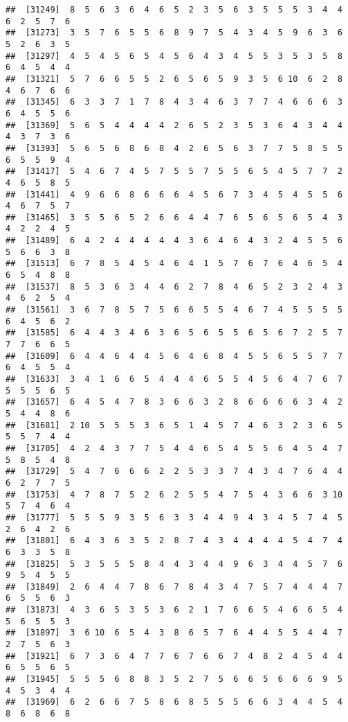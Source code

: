 \documentclass[
]{book}
\begin{document}
\begin{verbatim}
##  [31249]  8  5  6  3  6  4  6  5  2  3  5  6  3  5  5  5  3  4  4  6  2  5  7  6
##  [31273]  3  5  7  6  5  5  6  8  9  7  5  4  3  4  5  9  6  3  6  5  2  6  3  5
##  [31297]  4  5  4  5  6  5  4  5  6  4  3  4  5  5  3  5  3  5  8  6  4  5  4  4
##  [31321]  5  7  6  6  5  5  2  6  5  6  5  9  3  5  6 10  6  2  8  4  6  7  6  6
##  [31345]  6  3  3  7  1  7  8  4  3  4  6  3  7  7  4  6  6  6  3  6  4  5  5  6
##  [31369]  5  6  5  4  4  4  4  2  6  5  2  3  5  3  6  4  3  4  4  4  3  7  3  6
##  [31393]  5  6  5  6  8  6  8  4  2  6  5  6  3  7  7  5  8  5  5  6  5  5  9  4
##  [31417]  5  4  6  7  4  5  7  5  5  7  5  5  6  5  4  5  7  7  2  4  6  5  8  5
##  [31441]  4  9  6  6  8  6  6  6  4  5  6  7  3  4  5  4  5  5  6  4  6  7  5  7
##  [31465]  3  5  5  6  5  2  6  6  4  4  7  6  5  6  5  6  5  4  3  4  2  2  4  5
##  [31489]  6  4  2  4  4  4  4  4  3  6  4  6  4  3  2  4  5  5  6  5  6  6  3  8
##  [31513]  6  7  8  5  4  5  4  6  4  1  5  7  6  7  6  4  6  5  4  6  5  4  8  8
##  [31537]  8  5  3  6  3  4  4  6  2  7  8  4  6  5  2  3  2  4  3  4  6  2  5  4
##  [31561]  3  6  7  8  5  7  5  6  6  5  5  4  6  7  4  5  5  5  5  6  4  5  6  2
##  [31585]  6  4  4  3  4  6  3  6  5  6  5  5  6  5  6  7  2  5  7  7  7  6  6  5
##  [31609]  6  4  4  6  4  4  5  6  4  6  8  4  5  5  6  5  5  7  7  6  4  5  5  4
##  [31633]  3  4  1  6  6  5  4  4  4  6  5  5  4  5  6  4  7  6  7  5  5  5  6  5
##  [31657]  6  4  5  4  7  8  3  6  6  3  2  8  6  6  6  6  3  4  2  5  4  4  8  6
##  [31681]  2 10  5  5  5  3  6  5  1  4  5  7  4  6  3  2  3  6  5  5  5  7  4  4
##  [31705]  4  2  4  3  7  7  5  4  4  6  5  4  5  5  6  4  5  4  7  5  8  5  4  8
##  [31729]  5  4  7  6  6  6  2  2  5  3  3  7  4  3  4  7  6  4  4  6  2  7  7  5
##  [31753]  4  7  8  7  5  2  6  2  5  5  4  7  5  4  3  6  6  3 10  5  7  4  6  4
##  [31777]  5  5  5  9  3  5  6  3  3  4  4  9  4  3  4  5  7  4  5  2  6  4  2  6
##  [31801]  6  4  3  6  3  5  2  8  7  4  3  4  4  4  4  5  4  7  4  6  3  3  5  8
##  [31825]  5  3  5  5  5  8  4  4  3  4  4  9  6  3  4  4  5  7  6  9  5  4  5  5
##  [31849]  2  6  4  4  7  8  6  7  8  4  3  4  7  5  7  4  4  4  7  6  5  5  6  3
##  [31873]  4  3  6  5  3  5  3  6  2  1  7  6  6  5  4  6  6  5  4  5  6  5  5  3
##  [31897]  3  6 10  6  5  4  3  8  6  5  7  6  4  4  5  5  4  4  7  2  7  5  6  3
##  [31921]  6  7  3  6  4  7  7  6  7  6  6  7  4  8  2  4  5  4  4  6  5  5  6  5
##  [31945]  5  5  5  6  8  8  3  5  2  7  5  6  6  5  6  6  6  9  5  4  5  3  4  4
##  [31969]  6  2  6  6  7  5  8  6  8  5  5  5  6  6  3  4  4  5  4  8  6  8  6  8

\end{verbatim}
\end{document}
